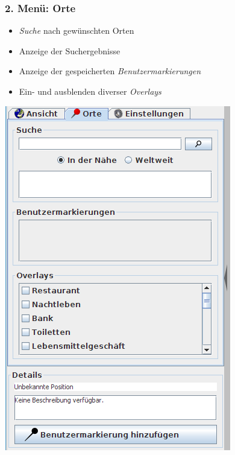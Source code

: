 \documentclass[10pt]{scrreprt}
\newcommand{\textref}[1]{\mbox{\raisebox{0.1ex}{\small$\rightarrow$ }\textit{#1}}}
\begin{document}
\vspace{10mm}
\begin{minipage}[t]{9cm}
\vspace{-40mm}
\subsubsection{2. Menü: Orte} 
	\begin{itemize}
	\item \textref{Suche} nach gewünschten Orten 
	\item Anzeige der Suchergebnisse
	\item Anzeige der gespeicherten \textref{Benutzermarkierungen} 
	\item Ein- und ausblenden diverser \textref{Overlays} 
	\end{itemize}
\end{minipage}
\begin{minipage}{7cm}
\centering
\includegraphics[scale=0.4]{images/orte_tab.png}
\end{minipage}
\end{document}
